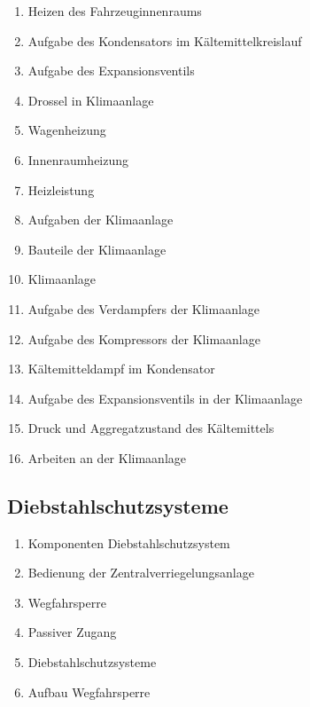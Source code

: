 \begin{enumerate}
\item
  Heizen des Fahrzeuginnenraums\\
\item
  Aufgabe des Kondensators im Kältemittelkreislauf\\
\item
  Aufgabe des Expansionsventils\\
\item
  Drossel in Klimaanlage\\
\item
  Wagenheizung\\
\item
  Innenraumheizung\\
\item
  Heizleistung\\
\item
  Aufgaben der Klimaanlage\\
\item
  Bauteile der Klimaanlage\\
\item
  Klimaanlage\\
\item
  Aufgabe des Verdampfers der Klimaanlage\\
\item
  Aufgabe des Kompressors der Klimaanlage\\
\item
  Kältemitteldampf im Kondensator\\
\item
  Aufgabe des Expansionsventils in der Klimaanlage\\
\item
  Druck und Aggregatzustand des Kältemittels\\
\item
  Arbeiten an der Klimaanlage
\end{enumerate}

\subsection{Diebstahlschutzsysteme}\label{diebstahlschutzsysteme}

\begin{enumerate}
\item
  Komponenten Diebstahlschutzsystem\\
\item
  Bedienung der Zentralverriegelungsanlage\\
\item
  Wegfahrsperre\\
\item
  Passiver Zugang\\
\item
  Diebstahlschutzsysteme\\
\item
  Aufbau Wegfahrsperre
\end{enumerate}

